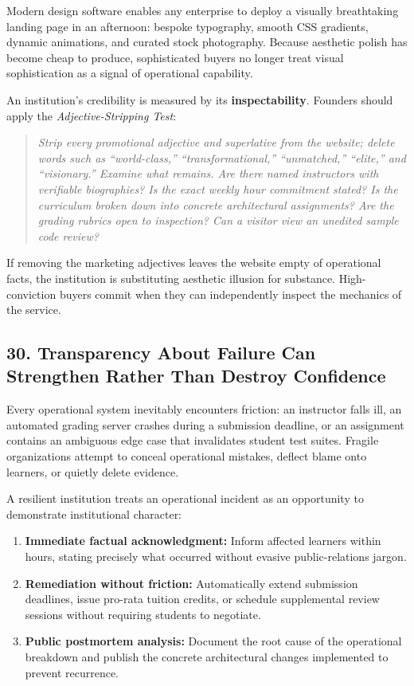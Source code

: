 Modern design software enables any enterprise to deploy a visually breathtaking landing page in an afternoon: bespoke typography, smooth CSS gradients, dynamic animations, and curated stock photography. Because aesthetic polish has become cheap to produce, sophisticated buyers no longer treat visual sophistication as a signal of operational capability.

An institution's credibility is measured by its \textbf{inspectability}. Founders should apply the \emph{Adjective-Stripping Test}:
\begin{quote}
\textit{Strip every promotional adjective and superlative from the website; delete words such as ``world-class,'' ``transformational,'' ``unmatched,'' ``elite,'' and ``visionary.'' Examine what remains. Are there named instructors with verifiable biographies? Is the exact weekly hour commitment stated? Is the curriculum broken down into concrete architectural assignments? Are the grading rubrics open to inspection? Can a visitor view an unedited sample code review?}
\end{quote}

If removing the marketing adjectives leaves the website empty of operational facts, the institution is substituting aesthetic illusion for substance. High-conviction buyers commit when they can independently inspect the mechanics of the service.

\subsection*{30. Transparency About Failure Can Strengthen Rather Than Destroy Confidence}

Every operational system inevitably encounters friction: an instructor falls ill, an automated grading server crashes during a submission deadline, or an assignment contains an ambiguous edge case that invalidates student test suites. Fragile organizations attempt to conceal operational mistakes, deflect blame onto learners, or quietly delete evidence.

A resilient institution treats an operational incident as an opportunity to demonstrate institutional character:
\begin{enumerate}
\item \textbf{Immediate factual acknowledgment:} Inform affected learners within hours, stating precisely what occurred without evasive public-relations jargon.
\item \textbf{Remediation without friction:} Automatically extend submission deadlines, issue pro-rata tuition credits, or schedule supplemental review sessions without requiring students to negotiate.
\item \textbf{Public postmortem analysis:} Document the root cause of the operational breakdown and publish the concrete architectural changes implemented to prevent recurrence.
\end{enumerate}

